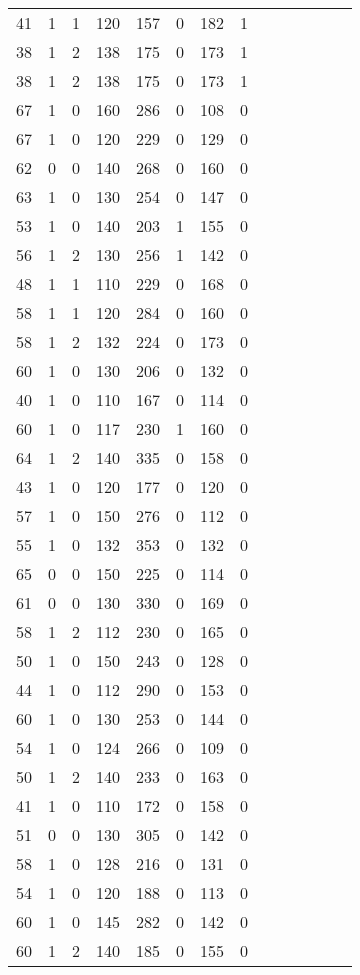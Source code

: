 \documentclass{article}
\begin{document}
\begin{longtable}{|c|c|c|c|c|c|c|c|c|c|c|c|c|c|}
41 & 1 & 1 & 120 & 157 & 0 & 182 & 1\\
38 & 1 & 2 & 138 & 175 & 0 & 173 & 1\\
38 & 1 & 2 & 138 & 175 & 0 & 173 & 1\\
67 & 1 & 0 & 160 & 286 & 0 & 108 & 0\\
67 & 1 & 0 & 120 & 229 & 0 & 129 & 0\\
62 & 0 & 0 & 140 & 268 & 0 & 160 & 0\\
63 & 1 & 0 & 130 & 254 & 0 & 147 & 0\\
53 & 1 & 0 & 140 & 203 & 1 & 155 & 0\\
56 & 1 & 2 & 130 & 256 & 1 & 142 & 0\\
48 & 1 & 1 & 110 & 229 & 0 & 168 & 0\\
58 & 1 & 1 & 120 & 284 & 0 & 160 & 0\\
58 & 1 & 2 & 132 & 224 & 0 & 173 & 0\\
60 & 1 & 0 & 130 & 206 & 0 & 132 & 0\\
40 & 1 & 0 & 110 & 167 & 0 & 114 & 0\\
60 & 1 & 0 & 117 & 230 & 1 & 160 & 0\\
64 & 1 & 2 & 140 & 335 & 0 & 158 & 0\\
43 & 1 & 0 & 120 & 177 & 0 & 120 & 0\\
57 & 1 & 0 & 150 & 276 & 0 & 112 & 0\\
55 & 1 & 0 & 132 & 353 & 0 & 132 & 0\\
65 & 0 & 0 & 150 & 225 & 0 & 114 & 0\\
61 & 0 & 0 & 130 & 330 & 0 & 169 & 0\\
58 & 1 & 2 & 112 & 230 & 0 & 165 & 0\\
50 & 1 & 0 & 150 & 243 & 0 & 128 & 0\\
44 & 1 & 0 & 112 & 290 & 0 & 153 & 0\\
60 & 1 & 0 & 130 & 253 & 0 & 144 & 0\\
54 & 1 & 0 & 124 & 266 & 0 & 109 & 0\\
50 & 1 & 2 & 140 & 233 & 0 & 163 & 0\\
41 & 1 & 0 & 110 & 172 & 0 & 158 & 0\\
51 & 0 & 0 & 130 & 305 & 0 & 142 & 0\\
58 & 1 & 0 & 128 & 216 & 0 & 131 & 0\\
54 & 1 & 0 & 120 & 188 & 0 & 113 & 0\\
60 & 1 & 0 & 145 & 282 & 0 & 142 & 0\\
60 & 1 & 2 & 140 & 185 & 0 & 155 & 0\\

\end{longtable}
\end{document}

